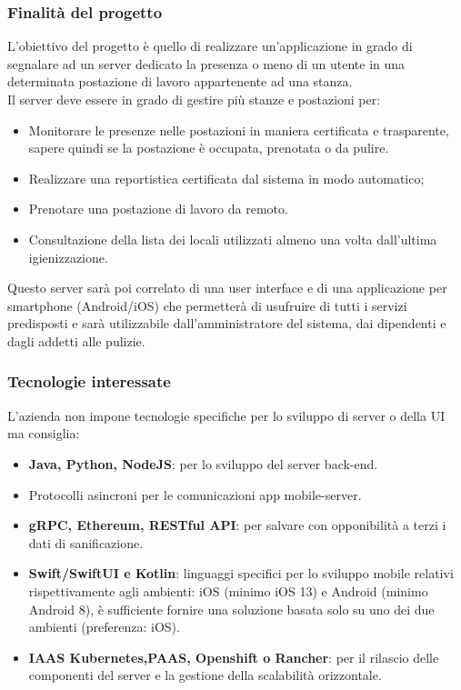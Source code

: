 		\subsubsection{Finalità del progetto}
			L’obiettivo del progetto è quello di realizzare un’applicazione in grado di segnalare ad un server dedicato la presenza o meno di un utente in una determinata postazione di lavoro appartenente ad una stanza.\\
			Il server deve essere in grado di gestire più stanze e postazioni per:\\
			\begin{itemize}
				\item Monitorare le presenze nelle postazioni in maniera certificata e trasparente, sapere quindi se la postazione è occupata, prenotata o da pulire.
				\item Realizzare una reportistica certificata dal sistema in modo automatico;
				\item Prenotare una postazione di lavoro da remoto.
				\item Consultazione della lista dei locali utilizzati almeno una volta dall’ultima igienizzazione.
			\end{itemize}
			Questo server sarà poi correlato di una user interface e di una applicazione per smartphone (Android/iOS) che permetterà di usufruire di tutti i servizi predisposti e sarà utilizzabile dall’amministratore del sistema, dai dipendenti e dagli addetti alle pulizie.
		
		\subsubsection{Tecnologie interessate}
			L’azienda non impone tecnologie specifiche per lo sviluppo di server o della UI ma consiglia:
			\begin{itemize}
				\item\textbf{Java, Python, NodeJS}: per lo sviluppo del server back-end.
				\item Protocolli asincroni per le comunicazioni app mobile-server.
				\item\textbf{gRPC, Ethereum, RESTful API}: per salvare con opponibilità a terzi i dati di sanificazione.
				\item\textbf{Swift/SwiftUI e Kotlin}:  linguaggi specifici per lo sviluppo mobile relativi rispettivamente agli ambienti: iOS (minimo iOS 13) e Android (minimo Android 8), è sufficiente fornire una soluzione basata solo su uno dei due ambienti (preferenza: iOS).
				\item\textbf{IAAS Kubernetes,PAAS, Openshift o Rancher}: per il rilascio delle componenti del server e la gestione della scalabilità orizzontale.
			\end{itemize}
			

